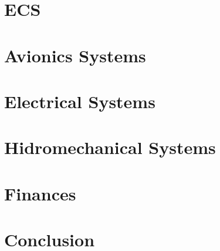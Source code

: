 \documentclass[12pt]{article} %
\numberwithin{figure}{section}
\numberwithin{table}{section}
\begin{document}
\newpage
\setcounter{page}{1}
\section{ECS}
    

\newpage
\setcounter{page}{1}
\section{Avionics Systems}
    

\newpage
\setcounter{page}{1}
\section{Electrical Systems}
    

\newpage
\setcounter{page}{1}
\section{Hidromechanical Systems}
    

\newpage
\setcounter{page}{1}
\section{Finances}
    

\newpage
\setcounter{page}{1}
\section{Conclusion}
    
\end{document}
